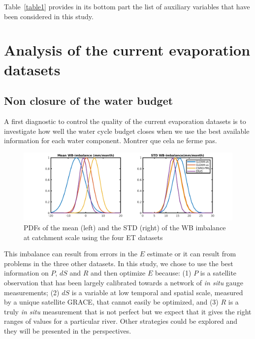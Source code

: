 \documentclass[draft]{agujournal2019}
\begin{document}
Table~\ref{table1} provides in its bottom part the list of auxiliary variables that have been considered in this study.


\section{Analysis of the current evaporation datasets}

\subsection{Non closure of the water budget}
A first diagnostic to control the quality of the current evaporation datasets is to investigate how well the water cycle budget closes when we use the best available information for each water component. 
Montrer que cela ne ferme pas.

\begin{figure}[h]
\centering
\includegraphics[width=\textwidth]{m_std_imb}
\caption{PDFs of the mean (left) and the STD (right) of the WB imbalance at catchment scale using the four ET datasets}
\end{figure}

This imbalance can result from errors in the $E$ estimate or it can result from problems in the three other datasets. In this study, we chose to use the best information on $P$, $dS$ and $R$ and then optimize $E$ because: (1) $P$ is a satellite observation that has been largely calibrated towards a network of {\it in situ} gauge measurements; (2) $dS$ is a variable at low temporal and spatial scale, measured by a unique satellite GRACE, that cannot easily be optimized, and (3) $R$ is a truly {\it in situ} measurement that is not perfect but we expect that it gives the right ranges of values for a particular river. Other strategies could be explored and they will be presented in the perspectives. 
\end{document}
